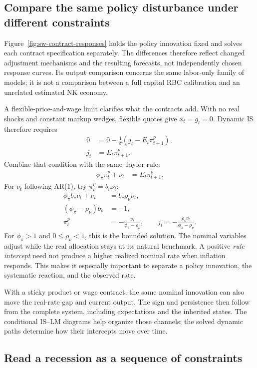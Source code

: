 \subsection{Compare the same policy disturbance under different constraints}

Figure~\ref{fig:sw-contract-responses} holds the policy innovation fixed and
solves each contract specification separately. The differences therefore reflect
changed adjustment mechanisms and the resulting forecasts, not independently
chosen response curves. Its output comparison concerns the same labor-only
family of models; it is not a comparison between a full capital RBC calibration
and an unrelated estimated NK economy.

A flexible-price-and-wage limit clarifies what the contracts add. With no
real shocks and constant markup wedges, flexible quotes give $x_t=g_t=0$.
Dynamic IS therefore requires
\begin{align}
 0&=0-\frac1\sigma(j_t-E_t\pi_{t+1}^p),\\
 j_t&=E_t\pi_{t+1}^p.
\end{align}
Combine that condition with the same Taylor rule:
\begin{align}
 \phi_\pi\pi_t^p+\nu_t&=E_t\pi_{t+1}^p.
\end{align}
For $\nu_t$ following AR(1), try $\pi_t^p=b_\nu\nu_t$:
\begin{align}
 \phi_\pi b_\nu\nu_t+\nu_t&=b_\nu\rho_\nu\nu_t,\\
 (\phi_\pi-\rho_\nu)b_\nu&=-1,\\
 \pi_t^p&=-\frac{\nu_t}{\phi_\pi-\rho_\nu},\qquad
 j_t=-\frac{\rho_\nu\nu_t}{\phi_\pi-\rho_\nu}.
\end{align}
For $\phi_\pi>1$ and $0\leq\rho_\nu<1$, this is the bounded solution.
The nominal variables adjust while the real allocation stays at its natural
benchmark. A positive \emph{rule intercept} need not produce a higher realized
nominal rate when inflation responds. This makes it especially important to
separate a policy innovation, the systematic reaction, and the observed rate.

With a sticky product or wage contract, the same nominal innovation can also
move the real-rate gap and current output. The sign and persistence then follow
from the complete system, including expectations and the inherited states.
The conditional IS--LM diagrams help organize those channels; the solved dynamic
paths determine how their intercepts move over time.

\subsection{Read a recession as a sequence of constraints}

